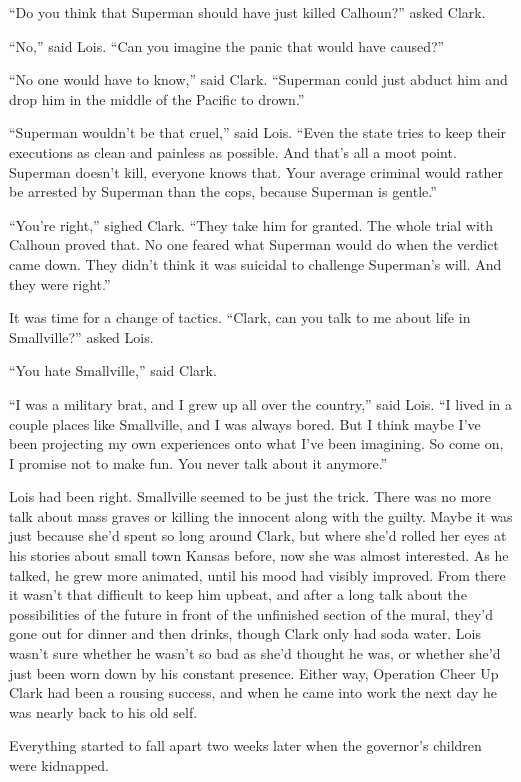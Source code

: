 \documentclass[ebook,12pt]{memoir}
\begin{document}
``Do you think that Superman should have just killed Calhoun?'' asked
Clark.

``No,'' said Lois. ``Can you imagine the panic that would have caused?''

``No one would have to know,'' said Clark. ``Superman could just abduct
him and drop him in the middle of the Pacific to drown.''

``Superman wouldn't be that cruel,'' said Lois. ``Even the state tries
to keep their executions as clean and painless as possible. And that's
all a moot point. Superman doesn't kill, everyone knows that. Your
average criminal would rather be arrested by Superman than the cops,
because Superman is gentle.''

``You're right,'' sighed Clark. ``They take him for granted. The whole
trial with Calhoun proved that. No one feared what Superman would do
when the verdict came down. They didn't think it was suicidal to
challenge Superman's will. And they were right.''

It was time for a change of tactics. ``Clark, can you talk to me about
life in Smallville?'' asked Lois.

``You hate Smallville,'' said Clark.

``I was a military brat, and I grew up all over the country,'' said
Lois. ``I lived in a couple places like Smallville, and I was always
bored. But I think maybe I've been projecting my own experiences onto
what I've been imagining. So come on, I promise not to make fun. You
never talk about it anymore.''

Lois had been right. Smallville seemed to be just the trick. There was
no more talk about mass graves or killing the innocent along with the
guilty. Maybe it was just because she'd spent so long around Clark, but
where she'd rolled her eyes at his stories about small town Kansas
before, now she was almost interested. As he talked, he grew more
animated, until his mood had visibly improved. From there it wasn't that
difficult to keep him upbeat, and after a long talk about the
possibilities of the future in front of the unfinished section of the
mural, they'd gone out for dinner and then drinks, though Clark only had
soda water. Lois wasn't sure whether he wasn't so bad as she'd thought
he was, or whether she'd just been worn down by his constant presence.
Either way, Operation Cheer Up Clark had been a rousing success, and
when he came into work the next day he was nearly back to his old self.

Everything started to fall apart two weeks later when the governor's
children were kidnapped.
\end{document}
